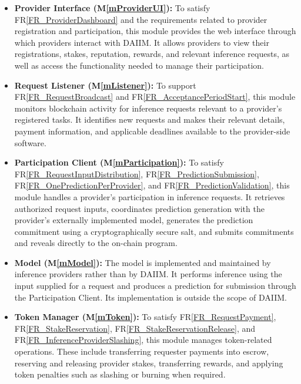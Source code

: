 \documentclass[12pt, titlepage]{article}
\newcommand{\mref}[1]{M\ref{#1}}
\newcommand{\rref}[1]{FR\ref{#1}}
\begin{document}
\begin{itemize}
    \item \textbf{Provider Interface (\mref{mProviderUI}):}
    To satisfy \rref{FR_ProviderDashboard} and the requirements related
    to provider registration and participation, this module provides
    the web interface through which providers interact with DAIIM.
    It allows providers to view their registrations, stakes, reputation,
    rewards, and relevant inference requests, as well as access the
    functionality needed to manage their participation.

    \item \textbf{Request Listener (\mref{mListener}):}
    To support \rref{FR_RequestBroadcast} and
    \rref{FR_AcceptancePeriodStart}, this module monitors blockchain
    activity for inference requests relevant to a provider's registered
    tasks. It identifies new requests and makes their relevant details,
    payment information, and applicable deadlines available to the
    provider-side software.

    \item \textbf{Participation Client (\mref{mParticipation}):}
    To satisfy \rref{FR_RequestInputDistribution},
    \rref{FR_PredictionSubmission},
    \rref{FR_OnePredictionPerProvider}, and
    \rref{FR_PredictionValidation}, this module handles a provider's
    participation in inference requests. It retrieves authorized
    request inputs, coordinates prediction generation with the
    provider's externally implemented model, generates the prediction
    commitment using a cryptographically secure salt, and submits
    commitments and reveals directly to the on-chain program.

    \item \textbf{Model (\mref{mModel}):}
    The model is implemented and maintained by inference providers
    rather than by DAIIM. It performs inference using the input supplied
    for a request and produces a prediction for submission through the
    Participation Client. Its implementation is outside the scope of
    DAIIM.

    \item \textbf{Token Manager (\mref{mToken}):}
    To satisfy \rref{FR_RequestPayment},
    \rref{FR_StakeReservation},
    \rref{FR_StakeReservationRelease},
    and \rref{FR_InferenceProviderSlashing}, this module manages
    token-related operations. These include transferring requester
    payments into escrow, reserving and releasing provider stakes,
    transferring rewards, and applying token penalties such as
    slashing or burning when required.


\end{itemize}
\end{document}
